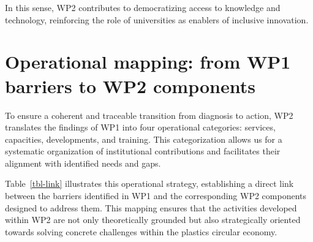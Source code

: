 \documentclass[
  12pt,
  oneside]{book}
\begin{document}
In this sense, WP2 contributes to democratizing access to knowledge and
technology, reinforcing the role of universities as enablers of
inclusive innovation.

\section{Operational mapping: from WP1 barriers to WP2
components}\label{operational-mapping-from-wp1-barriers-to-wp2-components}

To ensure a coherent and traceable transition from diagnosis to action,
WP2 translates the findings of WP1 into four operational categories:
services, capacities, developments, and training. This categorization
allows us for a systematic organization of institutional contributions
and facilitates their alignment with identified needs and gaps.

Table~\ref{tbl-link} illustrates this operational strategy, establishing
a direct link between the barriers identified in WP1 and the
corresponding WP2 components designed to address them. This mapping
ensures that the activities developed within WP2 are not only
theoretically grounded but also strategically oriented towards solving
concrete challenges within the plastics circular economy.

\begingroup\fontsize{11}{13}\selectfont
\end{document}
